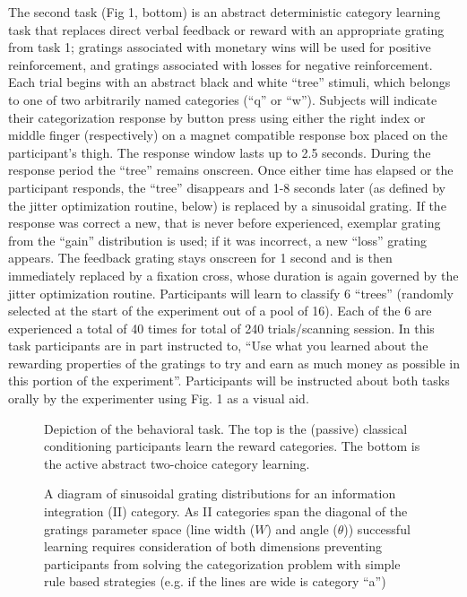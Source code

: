 \documentclass[doc,12pt]{apa}        %
\begin{document}
The second task (Fig 1, bottom) is an abstract deterministic category learning task that replaces direct verbal feedback or reward with an appropriate grating from task 1; gratings associated with monetary wins will be used for positive reinforcement, and gratings associated with losses for negative reinforcement.   Each trial begins with an abstract black and white ``tree'' stimuli, which belongs to one of two arbitrarily named categories (``q'' or ``w'').  Subjects will indicate their categorization response by button press using either the right index or middle finger (respectively) on a magnet compatible response box placed on the participant's thigh.  The response window lasts up to 2.5 seconds.  During the response period the ``tree'' remains onscreen.  Once either time has elapsed or the participant responds, the ``tree'' disappears and 1-8 seconds later (as defined by the jitter optimization routine, below) is replaced by a sinusoidal grating.  If the response was correct a new, that is never before experienced, exemplar grating from the ``gain'' distribution is used; if it was incorrect, a new ``loss'' grating appears.  The feedback grating stays onscreen for 1 second and is then immediately replaced by a fixation cross, whose duration is again governed by the jitter optimization routine.  Participants will learn to classify 6 ``trees'' (randomly selected at the start of the experiment out of a pool of 16). Each of the 6 are experienced a total of 40 times for total of 240 trials/scanning session. In this task participants are in part instructed to, ``Use what you learned about the rewarding properties of the gratings to try and earn as much money as possible in this portion of the experiment''.  Participants will be instructed about both tasks orally by the experimenter using Fig. 1 as a visual aid.

\begin{figure}[tp]
	\label{fig:task}
	\caption{Depiction of the behavioral task. The top is the (passive) classical conditioning participants learn the reward categories.  The bottom is the active abstract two-choice category learning.}
\end{figure}

\begin{figure}[tp]
	\label{fig:II}
	\caption{A diagram of sinusoidal grating distributions for an information integration (II) category.  As II categories span the diagonal of the gratings parameter space (line width ($W$) and angle ($\theta$)) successful learning requires consideration of both dimensions preventing participants from solving the categorization problem with simple rule based strategies (e.g. if the lines are wide is category ``a'')}
\end{figure}
\end{document}
